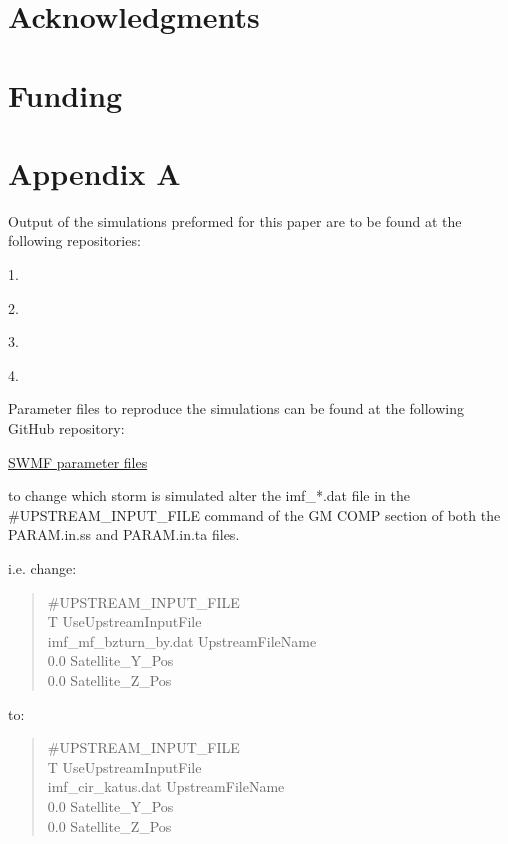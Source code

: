 \documentclass[utf8]{frontiersinFPHY_FAMS}
\begin{document}
\section{Acknowledgments}

\section{Funding}



\section{Appendix A} 

Output of the simulations preformed for this paper are to be found at the following repositories: 

1.

2.

3.

4.

Parameter files to reproduce the simulations can be found at the following GitHub repository:

\href{https://github.com/spacecataz/swmf_runfiles.git}{SWMF parameter files}

to change which storm is simulated alter the imf\_*.dat file in the \#UPSTREAM\_INPUT\_FILE command of the GM COMP section of both the PARAM.in.ss and PARAM.in.ta files. 

i.e. change: 

\begin{quote} %
\#UPSTREAM\_INPUT\_FILE \\
T                          UseUpstreamInputFile \\
imf\_mf\_bzturn\_by.dat    UpstreamFileName \\
0.0                        Satellite\_Y\_Pos \\
0.0                        Satellite\_Z\_Pos \\
\end{quote}

to: 

\begin{quote}
\#UPSTREAM\_INPUT\_FILE \\
T                       UseUpstreamInputFile \\
imf\_cir\_katus.dat     UpstreamFileName \\
0.0                     Satellite\_Y\_Pos \\
0.0                     Satellite\_Z\_Pos \\
\end{quote}
\end{document}
